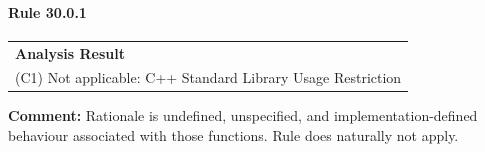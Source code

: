 \paragraph{Rule 30.0.1}
\begin{longtable}{p{13cm}}
\textbf{Analysis Result} \\
(C1) Not applicable: C++ Standard Library Usage Restriction \\
\end{longtable}
\textbf{Comment:} Rationale is undefined, unspecified, and implementation-defined behaviour associated with those functions. Rule does naturally not apply. \\
